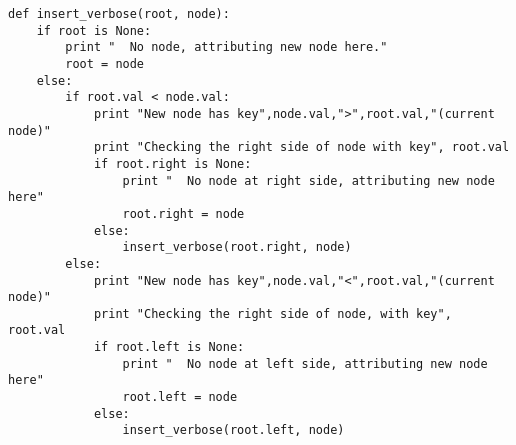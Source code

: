 \documentclass[11pt]{article}
\begin{document}
\begin{enumerate}
\begin{verbatim}
def insert_verbose(root, node):
    if root is None:
        print "  No node, attributing new node here."
        root = node
    else:
        if root.val < node.val:
            print "New node has key",node.val,">",root.val,"(current node)"
            print "Checking the right side of node with key", root.val
            if root.right is None:
                print "  No node at right side, attributing new node here"
                root.right = node
            else:
                insert_verbose(root.right, node)
        else:
            print "New node has key",node.val,"<",root.val,"(current node)"
            print "Checking the right side of node, with key", root.val
            if root.left is None:
                print "  No node at left side, attributing new node here"
                root.left = node
            else:
                insert_verbose(root.left, node)
                    

\end{verbatim}
\end{enumerate}
\end{document}
